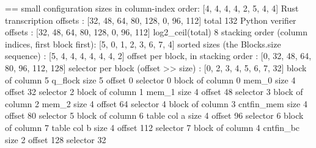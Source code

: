 \begin{srccode}
== small configuration
sizes in column-index order: [4, 4, 4, 4, 2, 5, 4, 4]
Rust transcription offsets : [32, 48, 64, 80, 128, 0, 96, 112] total 132
Python verifier offsets    : [32, 48, 64, 80, 128, 0, 96, 112] log2_ceil(total) 8
stacking order (column indices, first block first): [5, 0, 1, 2, 3, 6, 7, 4]
sorted sizes (the Blocks.size sequence)           : [5, 4, 4, 4, 4, 4, 4, 2]
offset per block, in stacking order               : [0, 32, 48, 64, 80, 96, 112, 128]
selector per block (offset >> size)               : [0, 2, 3, 4, 5, 6, 7, 32]
   block of column   5 q_flock        size  5 offset        0 selector 0
   block of column   0 mem_0          size  4 offset       32 selector 2
   block of column   1 mem_1          size  4 offset       48 selector 3
   block of column   2 mem_2          size  4 offset       64 selector 4
   block of column   3 cntfin_mem     size  4 offset       80 selector 5
   block of column   6 table col a    size  4 offset       96 selector 6
   block of column   7 table col b    size  4 offset      112 selector 7
   block of column   4 cntfin_bc      size  2 offset      128 selector 32


\end{srccode}
